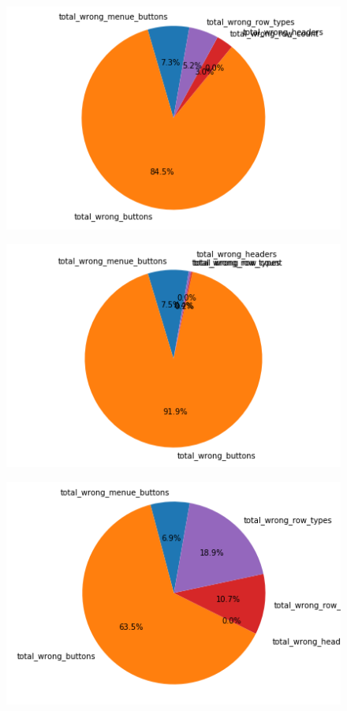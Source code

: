 \documentclass[pdftex,a4paper,halfparskip, article]{scrartcl}
\begin{document}
\begin{figure}
\centering
\begin{minipage}{.33\textwidth}
  \centering
  \includegraphics[width=1\linewidth]{predictions_bin10_total_error_types_pie_chart}
  \label{fig:fehler_gesamt_bin10}
\end{minipage}%
\begin{minipage}{.33\textwidth}
  \centering
  \includegraphics[width=1\linewidth]{predictions_bin10_excluded_p80_error_types_pie_chart}
  \label{fig:fehler_beste80_bin10}
\end{minipage}
\begin{minipage}{.33\textwidth}
  \centering
   \includegraphics[width=1\linewidth]{predictions_bin10_p80_error_types_pie_chart}

\end{minipage}
\end{figure}
\end{document}
